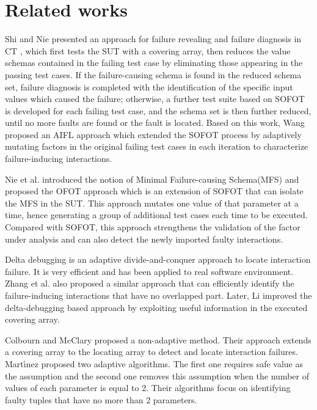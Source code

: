 {\section{Related works}\label{sec:related}
Shi and Nie \cite{shi2005software} presented an approach for failure revealing and failure diagnosis in CT , which first tests the SUT with a covering array, then reduces the value schemas contained in the failing test case by eliminating those appearing in the passing test cases. If the failure-causing schema is found in the reduced schema set, failure diagnosis is completed with the identification of the specific input values which caused the failure; otherwise, a further test suite based on SOFOT is developed for each failing test case, and the schema set is then further reduced, until no more faults are found or the fault is located. Based on this work, Wang \cite{wang2010adaptive} proposed an AIFL approach which extended the SOFOT process by adaptively mutating factors in the original failing test cases in each iteration to characterize failure-inducing interactions.

Nie et al. \cite{nie2011minimal} introduced the notion of Minimal Failure-causing Schema(MFS) and proposed the OFOT approach which is an extension of SOFOT that can isolate the MFS in the SUT. This approach mutates one value of that parameter at a time, hence generating a group of additional test cases each time to be executed. Compared with SOFOT, this approach  strengthens the validation of the factor under analysis and can also detect the newly imported faulty interactions.

Delta debugging \cite{zeller2002simplifying} is an adaptive divide-and-conquer approach to locate interaction failure. It is very efficient and has been applied to real software environment. Zhang et al. \cite{zhang2011characterizing} also proposed a similar approach that can efficiently identify the failure-inducing interactions that have no overlapped part. Later, Li \cite{li2012improved} improved the delta-debugging based approach by exploiting useful information in the executed covering array.

Colbourn and McClary \cite{colbourn2008locating} proposed a non-adaptive method. Their approach extends a covering array to the locating array to detect and locate interaction failures. Mart{\'\i}nez \cite{martinez2008algorithms,martinez2009locating} proposed two adaptive algorithms. The first one requires safe value as the assumption and the second one removes this assumption when the number of values of each parameter is equal to 2. Their algorithms focus on identifying faulty tuples that have no more than 2 parameters.

}
